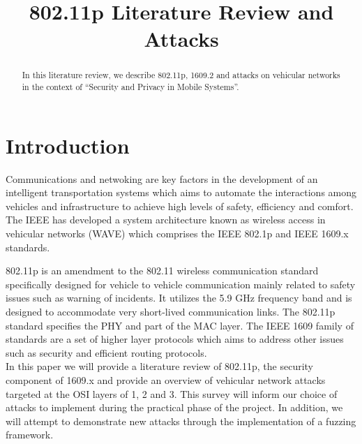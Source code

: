 \documentclass[conference]{IEEEtran}
\title{802.11p Literature Review and Attacks}
\author{\IEEEauthorblockN{Aniket Chaudhari and Alvin Cai and Wouter de Groot and Erik Schneider}
\IEEEauthorblockA{Technische Universiteit Eindhoven\\
Eindhoven, The Netherlands\\
\\
September 30, 2014}}
\begin{document}
\maketitle

\begin{abstract}
In this literature review, we describe 802.11p, 1609.2 and attacks on vehicular networks in the context of “Security and Privacy in Mobile Systems”.
\end{abstract}

\section{Introduction}

\begin{comment}
I think we should amend the first paragraph to provide an overview of VANET in general before jumping into 802.11p.

I made some amendments to para 2 and 3, to align to the modified scope. i.e. 
a) The literature review is the main meat of this project
b) It must provide a comprehensive survey of different attacks 
c) We can explain the attacks we want to implement in more detail
d) Focus on attacks in OSI layer 1-3
\end{comment}

Communications and netwoking are key factors in the development of an intelligent transportation systems which aims to automate the interactions among vehicles and infrastructure to achieve high levels of safety, efficiency and comfort. The IEEE has developed a system architecture known as wireless access in vehicular networks (WAVE) which comprises the IEEE 802.1p and IEEE 1609.x standards.

802.11p is an amendment to the 802.11 wireless communication standard specifically designed for vehicle to vehicle communication mainly related to safety issues such as warning of incidents. It utilizes the 5.9 GHz frequency band and is designed to accommodate very short-lived communication links. The 802.11p standard specifies the PHY and part of the MAC layer. The IEEE 1609 family of standards are a set of higher layer protocols which aims to address other issues such as security and efficient routing protocols.\\

In this paper we will provide a literature review of 802.11p, the security component of 1609.x and provide an overview of vehicular network attacks targeted at the OSI layers of 1, 2 and 3. This survey will inform our choice of attacks to implement during the practical phase of the project. In addition, we will attempt to demonstrate new attacks through the implementation of a fuzzing framework.
\end{document}
